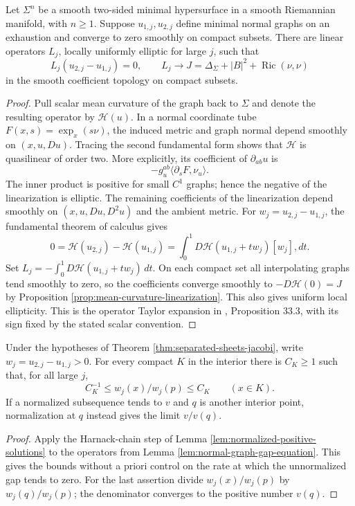 \begin{lemma}\label{lem:normal-graph-gap-equation}
Let $\Sigma^n$ be a smooth two-sided minimal hypersurface in a smooth Riemannian manifold, with $n\geq1$. Suppose $u_{1,j},u_{2,j}$ define minimal normal graphs on an exhaustion and converge to zero smoothly on compact subsets. There are linear operators $L_j$, locally uniformly elliptic for large $j$, such that
\[
 L_j(u_{2,j}-u_{1,j})=0,\qquad L_j\longrightarrow J=\Delta_\Sigma+|B|^2+\operatorname{Ric}(\nu,\nu)
\]
in the smooth coefficient topology on compact subsets.
\end{lemma}
\begin{proof}
Pull scalar mean curvature of the graph back to $\Sigma$ and denote the resulting operator by $\mathcal H(u)$. In a normal coordinate tube $F(x,s)=\exp_x(s\nu)$, the induced metric and graph normal depend smoothly on $(x,u,Du)$. Tracing the second fundamental form shows that $\mathcal H$ is quasilinear of order two. More explicitly, its coefficient of $\partial_{ab}u$ is
\[
 -g_u^{ab}\langle\partial_sF,\nu_u\rangle.
\]
The inner product is positive for small $C^1$ graphs; hence the negative of the linearization is elliptic. The remaining coefficients of the linearization depend smoothly on $(x,u,Du,D^2u)$ and the ambient metric. For $w_j=u_{2,j}-u_{1,j}$, the fundamental theorem of calculus gives
\[
 0=\mathcal H(u_{2,j})-\mathcal H(u_{1,j})
   =\int_0^1 D\mathcal H(u_{1,j}+tw_j)[w_j],dt.
\]
Set $L_j=-\int_0^1D\mathcal H(u_{1,j}+tw_j)\,dt$. On each compact set all interpolating graphs tend smoothly to zero, so the coefficients converge smoothly to $-D\mathcal H(0)=J$ by Proposition \ref{prop:mean-curvature-linearization}. This also gives uniform local ellipticity. This is the operator Taylor expansion in \cite{ChMin}, Proposition 33.3, with its sign fixed by the stated scalar convention.
\end{proof}

\begin{corollary}\label{cor:sheet-gap-comparison}
Under the hypotheses of Theorem \ref{thm:separated-sheets-jacobi}, write $w_j=u_{2,j}-u_{1,j}>0$. For every compact $K$ in the interior there is $C_K\geq1$ such that, for all large $j$,
\[
 C_K^{-1}\leq w_j(x)/w_j(p)\leq C_K\qquad(x\in K).
\]
If a normalized subsequence tends to $v$ and $q$ is another interior point, normalization at $q$ instead gives the limit $v/v(q)$.
\end{corollary}
\begin{proof}
Apply the Harnack-chain step of Lemma \ref{lem:normalized-positive-solutions} to the operators from Lemma \ref{lem:normal-graph-gap-equation}. This gives the bounds without a priori control on the rate at which the unnormalized gap tends to zero. For the last assertion divide $w_j(x)/w_j(p)$ by $w_j(q)/w_j(p)$; the denominator converges to the positive number $v(q)$.
\end{proof}

